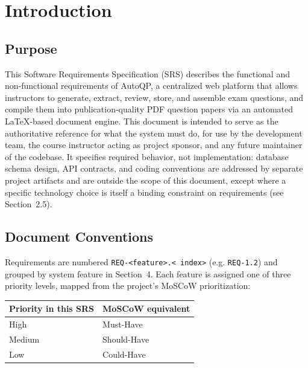 \documentclass[11pt]{article}
\begin{document}
\newpage
\pagestyle{fancy}
\tableofcontents
\newpage

\section{Introduction}

\subsection{Purpose}
This Software Requirements Specification (SRS) describes the functional and
non-functional requirements of AutoQP, a centralized web platform that
allows instructors to generate, extract, review, store, and assemble exam
questions, and compile them into publication-quality PDF question papers via
an automated LaTeX-based document engine. This document is intended to serve
as the authoritative reference for what the system must do, for use by the
development team, the course instructor acting as project sponsor, and any
future maintainer of the codebase. It specifies required behavior, not
implementation: database schema design, API contracts, and coding
conventions are addressed by separate project artifacts and are outside the
scope of this document, except where a specific technology choice is itself
a binding constraint on requirements (see Section~2.5).

\subsection{Document Conventions}
Requirements are numbered \texttt{REQ-\textless feature\textgreater.\textless
index\textgreater} (e.g. \texttt{REQ-1.2}) and grouped by system feature in
Section~4. Each feature is assigned one of three priority levels, mapped from
the project's MoSCoW prioritization:

\begin{center}
\begin{tabular}{@{}ll@{}}
\toprule
\textbf{Priority in this SRS} & \textbf{MoSCoW equivalent} \\
\midrule
High & Must-Have \\
Medium & Should-Have \\
Low & Could-Have \\
\bottomrule
\end{tabular}
\end{center}
\end{document}
